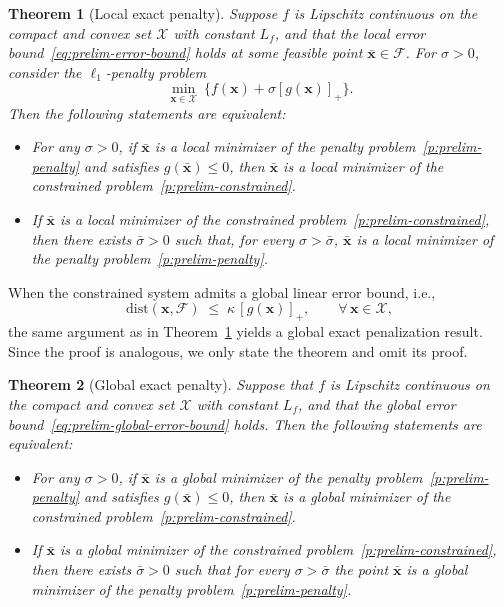\documentclass[11pt]{article}
\newtheorem{theorem}{Theorem}[section]
\def\bs{\boldsymbol}
\def\dist{\mathrm{dist}}
\def\X{\mathcal{X}}
\begin{document}
\begin{theorem}[Local exact penalty] \label{thm:prelim-local-exact-penalty}
Suppose $f$ is Lipschitz continuous on the compact and convex set $\X$ with constant $L_f$, and that the local error bound~\eqref{eq:prelim-error-bound} holds at some feasible point $\bar{\bs{x}}\in\mathcal{F}$. For $\sigma>0$, consider the $\ell_1$-penalty problem
\begin{equation}\label{p:prelim-penalty}
\min_{\bs{x}\in\X}\ \bigl\{ f(\bs{x})+\sigma[g(\bs{x})]_+\bigr\}.
\end{equation}
Then the following statements are equivalent:
\begin{itemize}
\item[(i)] For any $\sigma>0$, if $\bar{\bs{x}}$ is a local minimizer of the penalty problem~\eqref{p:prelim-penalty} and satisfies $g(\bar{\bs{x}})\le 0$, then $\bar{\bs{x}}$ is a local minimizer of the constrained problem~\eqref{p:prelim-constrained}.
\item[(ii)] If $\bar{\bs{x}}$ is a local minimizer of the constrained problem~\eqref{p:prelim-constrained}, then there exists $\bar\sigma>0$ such that, for every $\sigma>\bar\sigma$, $\bar{\bs{x}}$ is a local minimizer of the penalty problem~\eqref{p:prelim-penalty}.
\end{itemize}
\end{theorem}

When the constrained system admits a global linear error bound, i.e., 
\begin{equation}\label{eq:prelim-global-error-bound}
\dist(\bs{x},\mathcal{F}) \;\le\; \kappa\,[g(\bs{x})]_+,
\qquad \forall\,\bs{x}\in \X,
\end{equation}
the same argument as in Theorem~\ref{thm:prelim-local-exact-penalty} yields a global exact penalization result. Since the proof is analogous, we only state the theorem and omit its proof.

\begin{theorem}[Global exact penalty] \label{thm:prelim-global-exact-penalty}
Suppose that $f$ is Lipschitz continuous on the compact and convex set $\X$ with constant $L_f$, and that the global error bound~\eqref{eq:prelim-global-error-bound} holds.
Then the following statements are equivalent:
\begin{itemize}
\item[(i)] For any $\sigma>0$, if $\bar{\bs{x}}$ is a global minimizer of the penalty problem~\eqref{p:prelim-penalty} and satisfies $g(\bar{\bs{x}})\le 0$, then $\bar{\bs{x}}$ is a global minimizer of the constrained problem~\eqref{p:prelim-constrained}.
\item[(ii)] If $\bar{\bs{x}}$ is a global minimizer of the constrained problem~\eqref{p:prelim-constrained}, then there exists $\bar{\sigma}>0$ such that for every $\sigma>\bar\sigma$ the point $\bar{\bs{x}}$ is a global minimizer of the penalty problem~\eqref{p:prelim-penalty}.
\end{itemize}
\end{theorem}
\end{document}

